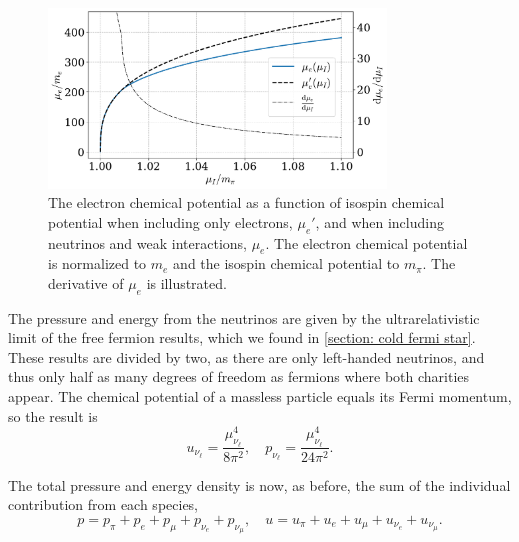 \begin{figure}[!htb]
    \centering
    \includegraphics[width=0.8\textwidth]{../scripts/figurer/neutrino_mu.pdf}
    \caption{
        The electron chemical potential as a function of isospin chemical potential when including only electrons, $\mu_e'$, and when including neutrinos and weak interactions, $\mu_e$.
        The electron chemical potential is normalized to $m_e$ and the isospin chemical potential to $m_\pi$.
        The derivative of $\mu_e$ is illustrated.
    }
    \label{fig: neutrino mu}
\end{figure}


The pressure and energy from the neutrinos are given by the ultrarelativistic limit of the free fermion results, which we found in \autoref{section: cold fermi star}.
These results are divided by two, as there are only left-handed neutrinos, and thus only half as many degrees of freedom as fermions where both charities appear.
The chemical potential of a massless particle equals its Fermi momentum, so the result is
%
\begin{equation}
    u_{\nu_\ell} = \frac{\mu_{\nu_\ell}^4}{8 \pi^2}, \quad 
    p_{\nu_\ell} = \frac{\mu_{\nu_\ell}^4}{24 \pi^2}.
\end{equation}
%

The total pressure and energy density is now, as before, the sum of the individual contribution from each species,
%
\begin{equation}
    p = p_\pi + p_e + p_\mu + p_{\nu_e} + p_{\nu_\mu}, \quad
    u = u_\pi + u_e + u_\mu + u_{\nu_e} + u_{\nu_\mu}.
\end{equation}
%

